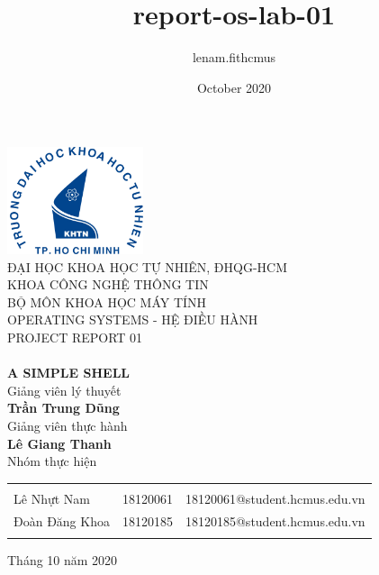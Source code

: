 \documentclass{article}
\title{report-os-lab-01}
\author{lenam.fithcmus }
\date{October 2020}
\begin{document}
\begin{titlepage}

\begin{center}

\includegraphics[width=0.3\textwidth]{hcmus.png}\\[0.1in]
\large{ĐẠI HỌC KHOA HỌC TỰ NHIÊN, ĐHQG-HCM\\KHOA CÔNG NGHỆ THÔNG TIN\\BỘ MÔN KHOA HỌC MÁY TÍNH}\\
\normalsize
\vspace{1cm}
\textup{\large {OPERATING SYSTEMS - HỆ ĐIỀU HÀNH}
\vspace{1cm}
\\ 
\Large PROJECT REPORT 01}\\[0.2in]

\huge \textbf {\\A SIMPLE SHELL}\\[0.2in]
\normalsize
Giảng viên lý thuyết\\
{\textbf{Trần Trung Dũng}}\\[0.1in]
Giảng viên thực hành\\
{\textbf{Lê Giang Thanh}}\\[0.2in]
Nhóm thực hiện \\
\begin{table}[h]
\centering
\begin{tabular}{l l l }\hline \\
Lê Nhựt Nam & 18120061 & 18120061@student.hcmus.edu.vn\\
Đoàn Đăng Khoa & 18120185 & 18120185@student.hcmus.edu.vn\\\\
\hline
\end{tabular}
\end{table}
\vspace{0.2in}

\vfill
Tháng 10 năm 2020
\end{center}
\end{titlepage}
\newpage


\cleardoublepage
{}
{}
\end{document}
